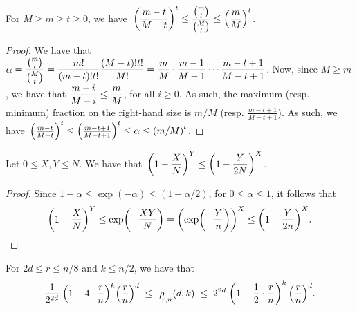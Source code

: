 \begin{lemma}%
    For $M \geq m \geq t\geq 0$, we have $\;\ds
    \pth{\frac{m-t}{M-t}}^t\leq \frac{\binom{m}{t}}{\binom{M}{t}}
    \leq \pth{\frac{m}{M}}^t$.
\end{lemma}
\begin{proof}
    We have that $\displaystyle \alpha = \frac{\binom{m}{t}}{\binom{M}{t}} =
    \frac{m!}{(m-t)!t!}  \frac{(M-t)!t!}{M!} = \frac{m}{M} \cdot
    \frac{m-1}{M-1} \cdots \frac{m-t+1}{M-t+1} $. Now, since $M \geq
    m$, we have that $\displaystyle \frac{m-i}{M-i} \leq \frac{m}{M}$, for all
    $i \geq 0$. As such, the maximum (resp. minimum) fraction on the
    right-hand size is $m/M$ (resp. $\frac{m-t+1}{M-t+1}$). As such,
    we have $\,\pth{\frac{m-t}{M-t}}^t \leq
    \pth{\frac{m-t+1}{M-t+1}}^t \leq \alpha \leq \pth{m/M}^t$.
\end{proof}


\begin{lemma}
    Let $0 \leq X, Y \leq N$. We have that
    $\,\ds\pth{1-\frac{X}{N}}^Y \leq \pth{1-\frac{Y}{2N}}^X$.
\end{lemma}

\begin{proof}
    Since $1-\alpha \leq \exp(-\alpha) \leq (1-\alpha/2)$, for $0 \leq
    \alpha \leq 1$, it follows that
    \begin{equation*}
        \pth{1-\frac{X}{N}}^Y %
        \leq%
        \exp \pth{ -\frac{XY}{N}}%
        =%
        \pth{\exp \pth{ -\frac{Y}{n}} }^X%
        \leq%
        \pth{ 1 -\frac{Y}{2n}}^X.
    \end{equation*}
\end{proof}


\begin{lemma}
    For $2d \leq r \leq n/8$ and $k \leq n/2$, we have that
    \begin{equation*}
        \ds \frac{1}{2^{2d}} \; \pth{ 1 - 4 \cdot \frac{ r}{n} }^{k}
        \pth{\frac{r}{n}}^d \;\leq \; \CSProbFull{r}{d}{k}{n} \;\leq\;
        2^{2d} \; \pth{ 1 - \frac{1}{2} \cdot \frac{r}{n} }^{k}
        \,\pth{\frac{r}{n}}^d.
    \end{equation*}
\end{lemma}

